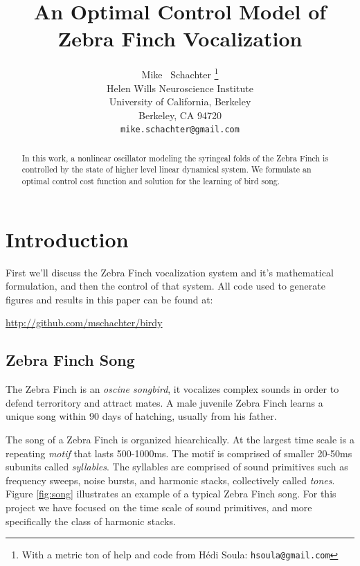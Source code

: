 \documentclass{article} %
\title{An Optimal Control Model of Zebra Finch Vocalization}
\author{
Mike ~Schachter
\thanks{ With a metric ton of help and code from H\'{e}di Soula:
\texttt{hsoula@gmail.com}} \\
Helen Wills Neuroscience Institute\\
University of California, Berkeley\\
Berkeley, CA 94720 \\
\texttt{mike.schachter@gmail.com}
}
\begin{document}
\maketitle

\begin{abstract}
In this work, a nonlinear oscillator modeling the syringeal folds of the
Zebra Finch is controlled by the state of higher level linear dynamical system.
We formulate an optimal control cost function and solution for the learning of
bird song.
\end{abstract}

\section{Introduction}

First we'll discuss the Zebra Finch vocalization system and it's mathematical
formulation, and then the control of that system. All code used to generate
figures and results in this paper can be found at:
\begin{center}
   \url{http://github.com/mschachter/birdy}
\end{center}

\subsection{Zebra Finch Song}

The Zebra Finch is an \emph{oscine songbird}, it vocalizes complex sounds in order
to defend terroritory and attract mates. A male juvenile Zebra Finch learns a unique
song within 90 days of hatching, usually from his father.

The song of a Zebra Finch is organized hiearchically. At the largest time scale is
a repeating \emph{motif} that lasts 500-1000ms. The motif is comprised of smaller
20-50ms subunits called \emph{syllables}. The syllables are comprised of sound
primitives such as frequency sweeps, noise bursts, and harmonic stacks, collectively
called \emph{tones}. Figure \ref{fig:song} illustrates an example of a typical Zebra
Finch song. For this project we have focused on the time scale of sound primitives,
and more specifically the class of harmonic stacks.
\end{document}
